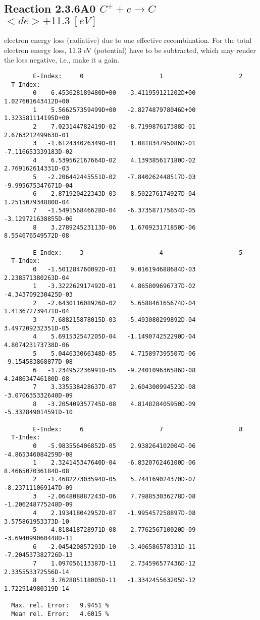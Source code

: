 \documentclass[12pt,dvipdfmx]{article}
\begin{document}
\subsection{
  Reaction 2.3.6A0 $C^+ + e \rightarrow C   $  \ $ <de>+11.3 \ [eV] $
}

  electron energy loss (radiative) due to one effective recombination.
  For the total electron energy loss, 11.3 eV (potential) have to be
  subtracted, which may render the loss negative, i.e., make it a gain.

\begin{small}\begin{verbatim}
        E-Index:     0                     1                     2
  T-Index:
        0    6.453628189480D+00   -3.411959121202D+00    1.027601643412D+00
        1    5.566257359499D+00   -2.827487978046D+00    1.323581114195D+00
        2    7.023144782419D-02   -8.719987617388D-01    2.676321249963D-01
        3   -1.612434026349D-01    1.081834795086D-01   -7.116653339183D-02
        4    6.539562167664D-02    4.139385617180D-02    2.769162614331D-03
        5   -2.206442445551D-02   -7.840262448517D-03   -9.995675347671D-04
        6    2.871920422343D-03    8.502276174927D-04    1.251507934880D-04
        7   -1.549156846628D-04   -6.373587175654D-05   -3.129721638855D-06
        8    3.278924523113D-06    1.670923171850D-06    8.554676549572D-08

        E-Index:     3                     4                     5
  T-Index:
        0   -1.501284760092D-01    9.016194688684D-03    2.238571380263D-04
        1   -3.322262917492D-01    4.865809696737D-02   -4.343709230425D-03
        2   -2.643011608926D-02    5.658846165674D-04    1.413672739471D-04
        3    7.688215878015D-03   -5.493080299892D-04    3.497209232351D-05
        4    5.691532547205D-04   -1.149074252290D-04    4.807423173738D-06
        5    5.044633066348D-05    4.715897395507D-06   -9.154583868877D-08
        6   -1.234952236991D-05   -9.240109636586D-08    4.248634746180D-08
        7    3.335538428637D-07    2.604300994523D-08   -3.070635332640D-09
        8   -3.205409357745D-08    4.814828405950D-09   -5.332849014591D-10

        E-Index:     6                     7                     8
  T-Index:
        0   -5.983556406852D-05    2.938264102004D-06   -4.865346084259D-08
        1    2.324145347640D-04   -6.832076246100D-06    8.466507036184D-08
        2   -1.468227303594D-05    5.744169024370D-07   -8.237111069147D-09
        3   -2.064808887243D-06    7.798853036278D-08   -1.206248775248D-09
        4    2.193418042952D-07   -1.995457258897D-08    3.575861953373D-10
        5   -4.818418728971D-08    2.776256710020D-09   -3.694099060448D-11
        6   -2.045420857293D-10   -3.406586578331D-11   -7.204537382726D-13
        7    1.097056113387D-11    2.734596577436D-12    2.335553372556D-14
        8    3.762885118005D-11   -1.334245563205D-12    1.722914980319D-14

  Max. rel. Error:   9.9451 %
  Mean rel. Error:   4.6015 %



\end{verbatim}\end{small}
\end{document}
